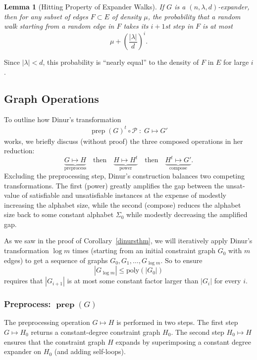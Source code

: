 \documentclass{article}
\newtheorem{lemma}[theorem]{Lemma}
\newcommand{\poly}{{\mathrm{poly}}}
\newcommand{\prep}{{\operatorname{prep}}}
\begin{document}
\begin{lemma}[Hitting Property of Expander Walks]
If $G$ is a $(n, \lambda, d)$-expander, then for any subset of edges $F \subset E$
of density $\mu$, the probability that a random walk starting from a random edge
in $F$ takes its $i+1$st step in $F$ is at most
$$
\mu + \left(\frac{|\lambda|}{d}\right)^i.
$$
\end{lemma}

Since $|\lambda|<d$, this probability is ``nearly equal'' to the density of
$F$ in $E$ for large $i$.

\subsection{Graph Operations}

To outline how Dinur's transformation
\begin{align*}
\prep(G)^t \circ \mathcal{P} \;:\; G \mapsto G'
\end{align*}
works, we briefly discuss (without proof) the three composed operations in her reduction:
$$
\underbrace{G \mapsto H}_\text{preprocess} \quad\text{then}\quad
\underbrace{H \mapsto H^t}_\text{power} \quad\text{then}\quad
\underbrace{H^t \mapsto G'}_\text{compose}.
$$
Excluding the preprocessing step, Dinur's construction balances two
competing transformations.  The first (power) greatly amplifies
the gap between the unsat-value of satisfiable and unsatisfiable
instances at the expense of modestly increasing the alphabet size,
while the second (compose) reduces the alphabet size back to some constant
alphabet $\Sigma_0$ while modestly decreasing the amplified gap.

As we saw in the proof of Corollary~\ref{dinursthm}, we will iteratively apply
Dinur's transformation $\log m$ times (starting from an initial constraint graph
$G_0$ with $m$ edges) to get a sequence of graphs $G_0, G_1, \dots, G_{\log m}$.
So to ensure
$$
|G_{\log m}| \le \poly(|G_0|)
$$
requires that $|G_{i+1}|$ is at most some constant factor larger
than $|G_i|$ for every $i$.

\subsubsection*{Preprocess: $\boldsymbol{\prep}(G)$}

The preprocessing operation $G \mapsto H$ is performed in two steps.
The first step $G \mapsto H_0$ returns a constant-degree constraint graph $H_0$.
The second step $H_0 \mapsto H$ ensures that the constraint graph $H$
expands by superimposing a constant degree expander on $H_0$ (and adding self-loops).
\end{document}
